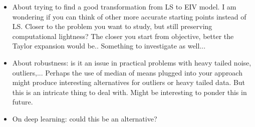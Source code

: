 \documentclass[11pt]{article}
\begin{document}
\begin{itemize}
    \begin{customthm}{5} \label{thm:five}
    Suppose that each of $H$, $J$, and $K$ is a Banach space, with $H$ compactly embedded in $J$, that $r>0$, and that $G:B_r(0) \rightarrow K$ is continuous as a function on $J$. Suppose also that $g$ belongs to $K$ and that for each $y$ in $b_r(0)$ there is an $h$ in $B_r(0)$, where $b_r(0)$ and $B_r(0)$ are open and closed balls in $H$ of radius $r$ centered at 0, such that
    \begin{equation} \lim\limits_{t \to 0+} -{\dfrac{1}{t} \left(G(y+th) - G(y)\right) = g}. \end{equation}
    Then, there exists $u$ in $B_r(0)$ such that $G(u)=g$.
    \end{customthm}
    
    The theorem implies that $u$ is a zero of the function  defined as $F(y) = G(y) - g$.  
    Since $G$ is a continuous function and if $\left(G' (y) \right)^{-1}$ exists for each $y$ in $B_r(0)$, a metric for the validity of the Theorem (\ref{thm:five}) hypothesis is the inequality $\left\Vert  \left( G' (y) \right)^{-1} g \right\Vert \leq r$.
    
    To link the data-driven step-input estimation problem with this theorem, we can take the system of linear equations $\widetilde{\mathbf{y}} = \widetilde{\mathbf{K}} \bm{\theta}$, then define $G(y) = \widetilde{\mathbf{K}} \bm{\theta}$, and $g = \widetilde{\mathbf{y}}$, so that we have $F(\bm{\theta}) = G(\bm{\theta}) - g$. The derivative of the function $G(\bm{\theta})$ is given by $G'(\bm{\theta}) = \widetilde{\mathbf{K}} \mathbf{I}$. Using the pseudo-inverse of $\widetilde{\mathbf{K}}$, the metric $\left\Vert  \widetilde{\mathbf{K}}^{\dagger} \widetilde{\mathbf{y}} \right\Vert \leq r$ indicates that the estimate $\hat{\bm{\theta}}$ is found inside a ball of radius $r$.
    Thus,  
	\color{black}
	
	\item  About trying to find a good transformation from LS to EIV model. I am wondering if you can think of other more accurate starting points instead of LS. Closer to the problem you want to study, but still preserving computational lightness? The closer you start from objective, better the Taylor expansion would be.. Something to investigate as well...
	\item  About robustness: is it an issue in practical problems with heavy tailed noise, outliers,... Perhaps the use of median of means plugged into your approach might produce interesting alternatives for outliers or heavy tailed data. But this is an intricate thing to deal with. Might be interesting to ponder this in future.
	\item  On deep learning: could this be an alternative?
\end{itemize}
\end{document}
